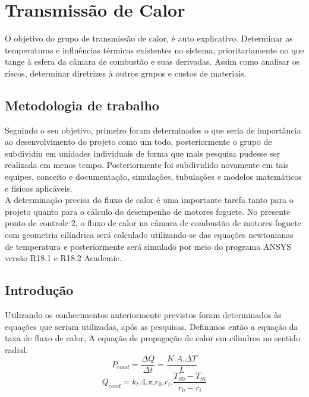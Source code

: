 \section{Transmissão de Calor}

O objetivo do grupo de transmissão de calor, é auto explicativo. Determinar as temperaturas e influências térmicas existentes no sistema, prioritariamente no que tange à esfera da câmara de combustão e suas derivadas. Assim como analisar os riscos, determinar diretrizes à outros grupos e custos de materiais.

\subsection{Metodologia de trabalho}

Seguindo o seu objetivo, primeiro foram determinados o que seria de importância ao desenvolvimento do projeto como um todo, posteriormente o grupo de subdividiu em unidades individuais de forma que mais pesquisa pudesse ser realizada em menos tempo. Posteriormente foi subdividido novamente em tais equipes, conceito e documentação, simulações, tubulações e modelos matemáticos e físicos aplicáveis.\\
A determinação precisa do fluxo de calor é uma importante tarefa tanto para o projeto quanto para o cálculo do desempenho de motores foguete. No presente ponto de controle 2, o fluxo de calor na câmara de combustão de motores-foguete com geometria cilíndrica será calculado utilizando-se das equações newtonianas de temperatura e posteriormente será simulado por meio do programa ANSYS versão R18.1 e R18.2 Academic.

\subsection{Introdução}

Utilizando os conhecimentos anteriormente previstos foram determinados às equações que seriam utilizadas, após as pesquisas. Definimos então a equação da taxa de fluxo de calor, A equação de propagação de calor em cilindros no sentido radial.\\
$$ P_{cond} = \frac{\Delta Q}{\Delta t} = \frac{K.A.\Delta T}{L}$$
$$ Q_{cond} = k_{t}.4.\pi.r_{0}.r_{i}.\frac{T_{S0}-T_{Si}}{r_{0}-r_{i}}$$
